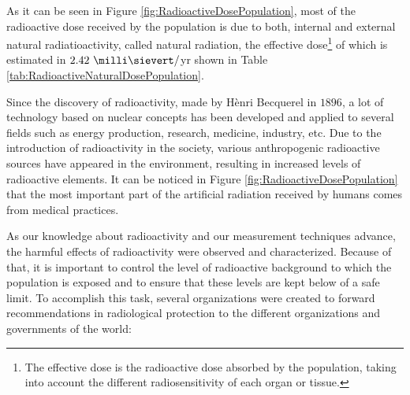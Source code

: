 As it can be seen in Figure \ref{fig:RadioactiveDosePopulation}, most of the radioactive dose received by the population is due to both, internal and external natural radiatioactivity, called natural radiation, the effective dose\footnote{The effective dose is the radioactive dose absorbed by the population, taking into account the different radiosensitivity of each organ or tissue.} of which is estimated in $2.42~\milli\sievert/$yr shown in Table \ref{tab:RadioactiveNaturalDosePopulation}. 

Since the discovery of radioactivity, made by Hènri Becquerel in $1896$, a lot of technology based on nuclear concepts has been developed and applied to several fields such as energy production, research, medicine, industry, etc. Due to the introduction of radioactivity in the society, various anthropogenic radioactive sources have appeared in the environment, resulting in increased levels of radioactive elements.  It can be noticed in Figure \ref{fig:RadioactiveDosePopulation} that the most important part of the artificial radiation received by humans comes from medical practices. 

As our knowledge about radioactivity and our measurement techniques advance, the harmful effects of radioactivity were observed and characterized. Because of that, it is important to control the level of radioactive background to which the population is exposed and to ensure that these levels are kept below of a safe limit. To accomplish this task, several organizations were created to forward recommendations in radiological protection to the different organizations and governments of the world:

